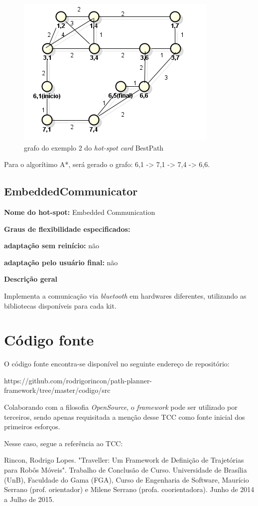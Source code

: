 \begin{apendicesenv}
\begin{figure}[H]
	\centering
	\label{fig56}
		\includegraphics[keepaspectratio=true,scale=0.7]{figuras/grafohotspotcard2.PNG}
	\caption{grafo do exemplo 2 do \textit{hot-spot card} BestPath}
\end{figure}

Para o algorítimo A*, será gerado o grafo: 6,1 -> 7,1 -> 7,4 -> 6,6.

\section{EmbeddedCommunicator}

{\large \textbf{Nome do hot-spot:}} Embedded Communication

{\large \textbf{Graus de flexibilidade especificados:}}

\textbf{adaptação sem reinício:} não

\textbf{adaptação pelo usuário final:} não

{\large \textbf{Descrição geral}}

Implementa a comunicação via \textit{bluetooth} em hardwares diferentes, utilizando as bibliotecas disponíveis para cada kit.

\chapter{Código fonte}

O código fonte encontra-se disponível no seguinte endereço de repositório: 

https://github.com/rodrigorincon/path-planner-framework/tree/master/codigo/src 

Colaborando com a filosofia \textit{OpenSource}, o \textit{framework} pode ser utilizado por terceiros, sendo apenas requisitada a menção desse TCC como fonte inicial dos primeiros esforços.

Nesse caso, segue a referência ao TCC:

Rincon, Rodrigo Lopes. "Traveller: Um Framework de Definição de Trajetórias para Robôs Móveis". Trabalho de Conclusão de Curso. Universidade de Brasília (UnB), Faculdade do Gama (FGA), Curso de Engenharia de Software, Maurício Serrano (prof. orientador) e Milene Serrano (profa. coorientadora). Junho de 2014 a Julho de 2015.

\end{apendicesenv}
